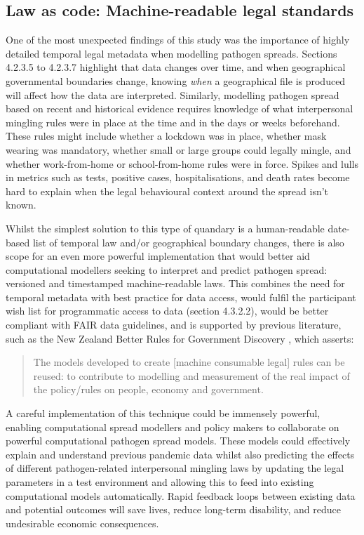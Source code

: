 \documentclass{CUP-JNL-DAP}%
\begin{document}
\subsection{Law as code: Machine-readable legal standards}

One of the most unexpected findings of this study was the importance of highly detailed temporal legal metadata when modelling pathogen spreads. Sections 4.2.3.5 to 4.2.3.7 highlight that data changes over time, and when geographical governmental boundaries change, knowing \textit{when} a geographical file is produced will affect how the data are interpreted. Similarly, modelling pathogen spread based on recent and historical evidence requires knowledge of what interpersonal mingling rules were in place at the time and in the days or weeks beforehand. These rules might include whether a lockdown was in place, whether mask wearing was mandatory, whether small or large groups could legally mingle, and whether work-from-home or school-from-home rules were in force. Spikes and lulls in metrics such as tests, positive cases, hospitalisations, and death rates become hard to explain when the legal behavioural context around the spread isn't known. 

Whilst the simplest solution to this type of quandary is a human-readable date-based list of temporal law and/or geographical boundary changes, there is also scope for an even more powerful implementation that would better aid computational modellers seeking to interpret and predict pathogen spread: versioned and timestamped machine-readable laws. This combines the need for temporal metadata with best practice for data access, would fulfil the participant wish list for programmatic access to data (section 4.3.2.2), would be better compliant with FAIR data guidelines, and is supported by previous literature, such as the New Zealand Better Rules for Government Discovery \cite{better_rules_machine_legislation}, which asserts: 

\blockquote{The models developed to create [machine consumable legal] rules can be reused: to contribute to modelling
and measurement of the real impact of the policy/rules on people, economy and
government.}

A careful implementation of this technique could be immensely powerful, enabling computational spread modellers and policy makers to collaborate on powerful computational pathogen spread models. These models could effectively explain and understand previous pandemic data whilst also predicting the effects of different pathogen-related interpersonal mingling laws by updating the legal parameters in a test environment and allowing this to feed into existing computational models automatically. Rapid feedback loops between existing data and potential outcomes will save lives, reduce long-term disability, and reduce undesirable economic consequences. 
\end{document}
